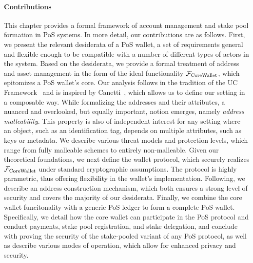 \paragraph{Contributions}
This chapter provides a formal framework of account management and stake
pool formation in PoS systems. In more detail, our contributions are as
follows. First, we present the relevant desiderata of a PoS wallet, \ie a set
of requirements general and flexible enough to be compatible with a number of
different types of actors in the system. Based on the desiderata, we provide a
formal treatment of address and asset management in the form of the ideal
functionality $\mathcal{F}_\mathrm{CoreWallet}$, which epitomizes a PoS wallet's core. Our analysis
follows in the tradition of the UC Framework~\cite{FOCS:Canetti01} and is
inspired by Canetti~\cite{EPRINT:Canetti03}, which allows us to define our
setting in a composable way. While formalizing the addresses and their
attributes, a nuanced and overlooked, but equally important, notion emerges,
namely \emph{address malleability}. This property is also of independent
interest for any setting where an object, such as an identification tag,
depends on multiple attributes, such as keys or metadata.  We describe various
threat models and protection levels, which range from fully malleable schemes
to entirely non-malleable.  Given our theoretical foundations, we next define
the wallet protocol, which securely realizes $\mathcal{F}_\mathrm{CoreWallet}$ under standard
cryptographic assumptions. The protocol is highly parametric, thus offering
flexibility in the wallet's implementation. Following, we describe an address
construction mechanism, which both ensures a strong level of security and
covers the majority of our desiderata. Finally, we combine the core wallet
funcitonality with a generic PoS ledger to form a complete PoS wallet.
Specifically, we detail how the core wallet can participate in the PoS protocol
and conduct payments, stake pool registration, and stake delegation, and
conclude with proving the security of the stake-pooled variant of any PoS
protocol, as well as describe various modes of operation, which allow for
enhanced privacy and security.
